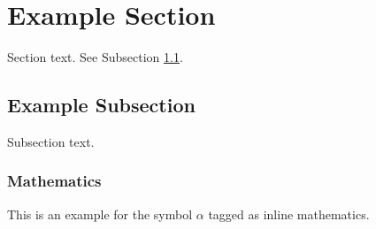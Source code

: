 \documentclass[preprint,12pt,authoryear]{elsarticle}
\begin{document}
\begin{frontmatter}
\begin{keyword}



\end{keyword}

\end{frontmatter}



\section{Example Section}
\label{sec1}

Section text. See Subsection \ref{subsec1}.

\subsection{Example Subsection}
\label{subsec1}

Subsection text.


\subsubsection{Mathematics}
This is an example for the symbol $\alpha$ tagged as inline mathematics.
\end{document}
